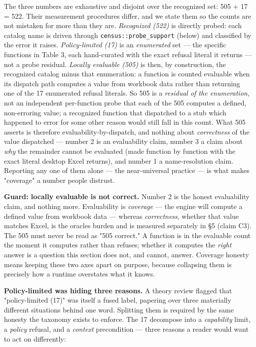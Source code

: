 \documentclass[
]{article}
\begin{document}
The three numbers are exhaustive and disjoint over the recognized set:
505 + 17 = 522. Their measurement procedures differ, and we state them
so the counts are not mistaken for more than they are. \emph{Recognized
(522)} is directly probed: each catalog name is driven through
\texttt{census::probe\_support} (below) and classified by the error it
raises. \emph{Policy-limited (17)} is an \emph{enumerated} set --- the
specific functions in Table 3, each hand-curated with the exact refusal
literal it returns --- not a probe residual. \emph{Locally evaluable
(505)} is then, by construction, the recognized catalog minus that
enumeration: a function is counted evaluable when its dispatch path
computes a value from workbook data rather than returning one of the 17
enumerated refusal literals. So 505 is a \emph{residual of the
enumeration}, not an independent per-function probe that each of the 505
computes a defined, non-erroring value; a recognized function that
dispatched to a stub which happened to error for some other reason would
still fall in this count. What 505 asserts is therefore
evaluability-by-dispatch, and nothing about \emph{correctness} of the
value dispatched --- number 2 is an evaluability claim, number 3 a claim
about \emph{why} the remainder cannot be evaluated (made function by
function with the exact literal desktop Excel returns), and number 1 a
name-resolution claim. Reporting any one of them alone --- the
near-universal practice --- is what makes "coverage" a number people
distrust.

\textbf{Guard: locally evaluable is not correct.} Number 2 is the honest
evaluability claim, and nothing more. Evaluability is \emph{coverage}
--- the engine will compute a defined value from workbook data ---
whereas \emph{correctness}, whether that value matches Excel, is the
oracle\textquotesingle s burden and is measured separately in §5 (claim
C3). The 505 must never be read as "505 correct." A function is in the
evaluable count the moment it computes rather than refuses; whether it
computes the \emph{right} answer is a question this section does not,
and cannot, answer. Coverage honesty means keeping these two axes apart
on purpose, because collapsing them is precisely how a runtime
overstates what it knows.

\textbf{Policy-limited was hiding three reasons.} A theory review
flagged that "policy-limited (17)" was itself a fused label, papering
over three materially different situations behind one word. Splitting
them is required by the same honesty the taxonomy exists to enforce. The
17 decompose into a \emph{capability} limit, a \emph{policy} refusal,
and a \emph{context} precondition --- three reasons a reader would want
to act on differently:
\end{document}
